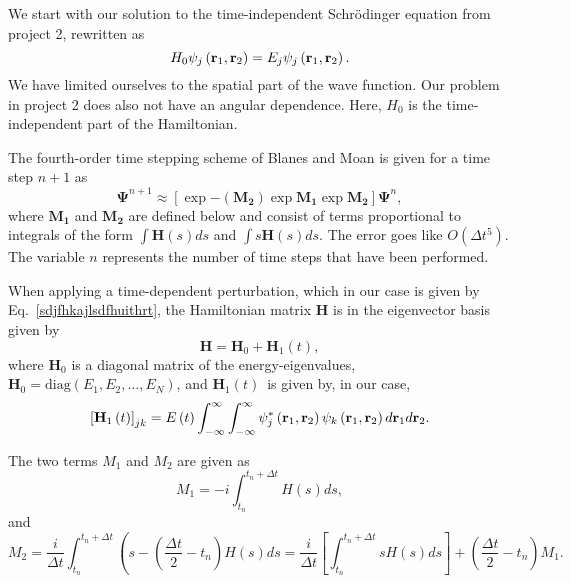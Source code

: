 \documentclass[10pt]{revtex4}
\begin{document}
We start with our solution to the time-independent Schr\"odinger equation from project 2, rewritten as
\begin{equation}
H_0 \psi _j \left({\bf r}_1,{\bf r}_2\right) = E_j \psi _j \left({\bf r}_1,{\bf r}_2\right).
\end{equation} 
We have limited ourselves to the spatial part of the wave function. Our problem in project 2 does also not have an angular dependence.
Here, $H_0$ is the time-independent part of the Hamiltonian.

The fourth-order time stepping scheme of Blanes and Moan is given for a time
step $n+1$ as
\begin{equation}
\mathbf{\Psi}^{n+1} \approx\left[ \exp{-(\mathbf{M_2})}\exp{\mathbf{M_1}}\exp{\mathbf{M_2}}\right] \mathbf{\Psi}^n,
\label{eq:finals}
\end{equation}
where $\mathbf{M_1}$ and $\mathbf{M_2}$ are defined below
and consist of terms proportional 
to integrals of the form $\int \mathbf{H}\left(s\right)ds$ and  $\int s\mathbf{H}\left(s\right)ds$. 
The error goes like $O(\Delta t^5)$. The variable $n$ represents the number of time steps that have been performed.

When applying a time-dependent perturbation, which in our case is given by Eq.~\ref{sdjfhkajlsdfhuithrt}, 
the Hamiltonian matrix $\mathbf{H}$ is in the eigenvector basis given by
\begin{equation}
\mathbf{H} = \mathbf{H}_0 + \mathbf{H}_1 \left(t\right),
\end{equation}
where $\mathbf{H}_0$ is a diagonal matrix of the energy-eigenvalues, $\mathbf{H}_0 = \mathrm{diag} \left(E_1,E_2,\ldots,E_N \right)$, and $\mathbf{H}_1 \left(t\right)\,$ is given by, in our case, 
\begin{equation}
\left[\mathbf{H}_1 \left(t\right)\right]_{jk} = E \left( t\right) \int^{\infty}_{-\infty}\int^{\infty}_{-\infty} \psi^*_j \left({\bf r}_1,{\bf r}_2\right) \psi_k \left({\bf r}_1,{\bf r}_2\right) d{\bf r}_1 d{\bf r}_2.
\end{equation}

The two terms $M_1$ and $M_2$ are given as
\begin{equation}
	M_1 = -i \int ^{t_n+\Delta t}_{t_n} H \left( s \right) ds , 
\end{equation}
and 
\begin{equation}
	M_2 = \frac{i}{\Delta t} \int^{t_n+\Delta t}_{t_n} \left( s-\left(\frac{\Delta t}{2} -t_n \right)H \left( s \right) ds= \frac{i}{\Delta t} \left[ \int^{t_n+\Delta t}_{t_n} sH\left(s\right) ds \right] +\left(  \frac{\Delta t}{2}-t_n \right)M_1.
\end{equation}
\end{document}
